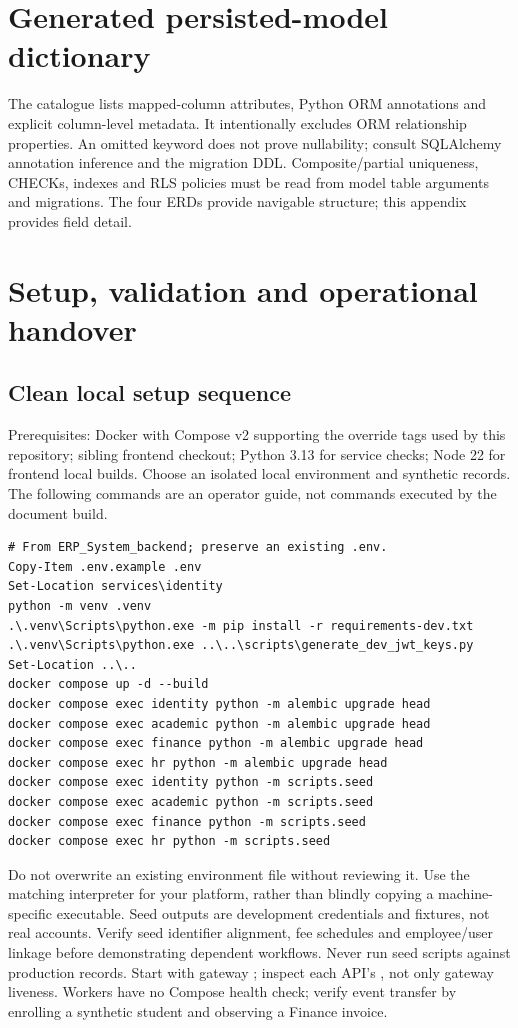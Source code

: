 \documentclass[10pt,a4paper]{article}
\begin{document}
\clearpage
\section{Generated persisted-model dictionary}\label{app:models}
The catalogue lists mapped-column attributes, Python ORM annotations and explicit
column-level metadata. It intentionally excludes ORM relationship properties.
An omitted  keyword does not prove nullability; consult SQLAlchemy
annotation inference and the migration DDL. Composite/partial uniqueness, CHECKs,
indexes and RLS policies must be read from model table arguments and migrations.
The four ERDs provide navigable structure; this appendix provides field detail.


\clearpage
\section{Setup, validation and operational handover}\label{app:operations}
\subsection{Clean local setup sequence}
Prerequisites: Docker with Compose v2 supporting the override tags used by this
repository; sibling frontend checkout; Python 3.13 for service checks; Node 22 for
frontend local builds. Choose an isolated local environment and synthetic records.
The following commands are an operator guide, not commands executed by the document build.
\begin{lstlisting}
# From ERP_System_backend; preserve an existing .env.
Copy-Item .env.example .env
Set-Location services\identity
python -m venv .venv
.\.venv\Scripts\python.exe -m pip install -r requirements-dev.txt
.\.venv\Scripts\python.exe ..\..\scripts\generate_dev_jwt_keys.py
Set-Location ..\..
docker compose up -d --build
docker compose exec identity python -m alembic upgrade head
docker compose exec academic python -m alembic upgrade head
docker compose exec finance python -m alembic upgrade head
docker compose exec hr python -m alembic upgrade head
docker compose exec identity python -m scripts.seed
docker compose exec academic python -m scripts.seed
docker compose exec finance python -m scripts.seed
docker compose exec hr python -m scripts.seed
\end{lstlisting}
Do not overwrite an existing environment file without reviewing it. Use the matching
interpreter for your platform, rather than blindly copying a machine-specific executable.
Seed outputs are development credentials and fixtures, not real accounts.
Verify seed identifier alignment, fee schedules and employee/user linkage before
demonstrating dependent workflows. Never run seed scripts against production records.
Start with gateway ; inspect each API's ,
not only gateway liveness. Workers have no Compose health check; verify event
transfer by enrolling a synthetic student and observing a Finance invoice.
\end{document}
